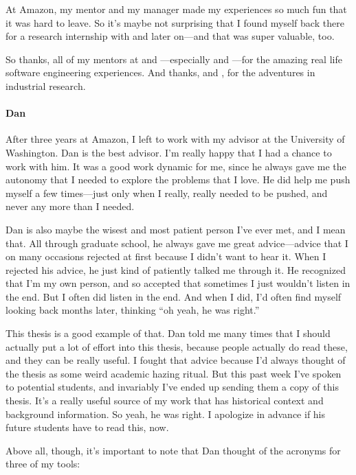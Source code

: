 At Amazon, my mentor  and my manager  made my experiences so much fun
that it was hard to leave. So it's maybe not surprising that I found myself back there for a research internship with
 and  later on---and that was super valuable, too.

So thanks, all of my mentors at  and ---especially  and ---for
the amazing real life software engineering experiences. And thanks,  and , for the adventures in industrial research.

\paragraph{Dan}
After three years at Amazon, I left to work with my advisor  at the University of Washington.
Dan is the best advisor.
I'm really happy that I had a chance to work with him.
It was a good work dynamic for me, since he always gave me the autonomy that I needed to explore the problems that I love.
He did help me push myself a few times---just only when I really, really needed to be pushed,
and never any more than I needed.

Dan is also maybe the wisest and most patient person I've ever met, and I mean that.
All through graduate school, he always gave me great advice---advice that I on many occasions rejected at first because I didn't want to hear it.
When I rejected his advice, he just kind of patiently talked me through it.
He recognized that I'm my own person, and so accepted that sometimes I just wouldn't listen in the end.
But I often did listen in the end.
And when I did, I'd often find myself looking back months later, thinking ``oh yeah, he was right.''

This thesis is a good example of that.
Dan told me many times that I should actually put a lot of effort into this thesis, because people actually do read these,
and they can be really useful.
I fought that advice because I'd always thought of the thesis as some weird academic hazing ritual.
But this past week I've spoken to potential students, and invariably I've ended up sending them a copy of this thesis.
It's a really useful source of my work that has historical context and background information.
So yeah, he was right. I apologize in advance if his future students have to read this, now.

Above all, though, it's important to note that Dan thought of the acronyms for three of my tools:

